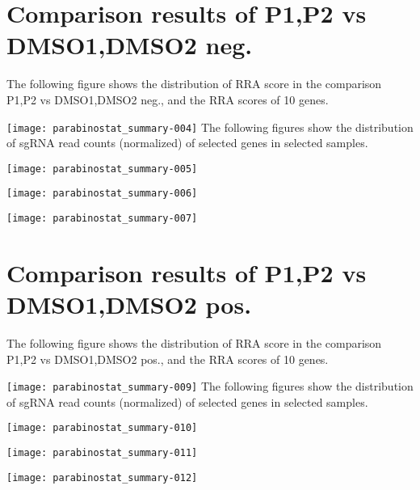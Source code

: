 \documentclass{article}
\begin{document}
\newpage\section{Comparison results of P1,P2 vs DMSO1,DMSO2 neg.}

The following figure shows the distribution of RRA score in the comparison P1,P2 vs DMSO1,DMSO2 neg., and the RRA scores of 10 genes.

%


\texttt{[image: parabinostat\_summary-004]}
\clearpage
\newpage
The following figures show the distribution of sgRNA read counts (normalized) of selected genes in selected samples.
%


\texttt{[image: parabinostat\_summary-005]}
%


\texttt{[image: parabinostat\_summary-006]}
%


\texttt{[image: parabinostat\_summary-007]}

\newpage\section{Comparison results of P1,P2 vs DMSO1,DMSO2 pos.}

The following figure shows the distribution of RRA score in the comparison P1,P2 vs DMSO1,DMSO2 pos., and the RRA scores of 10 genes.

%


\texttt{[image: parabinostat\_summary-009]}
\clearpage
\newpage
The following figures show the distribution of sgRNA read counts (normalized) of selected genes in selected samples.
%


\texttt{[image: parabinostat\_summary-010]}
%


\texttt{[image: parabinostat\_summary-011]}
%


\texttt{[image: parabinostat\_summary-012]}
\end{document}
